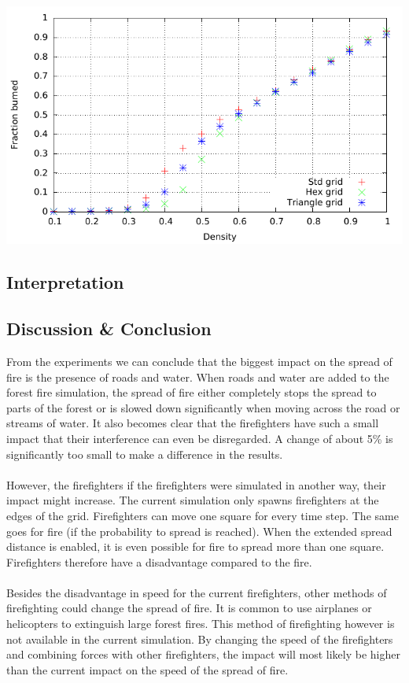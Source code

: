 \documentclass{article}
\newenvironment{Figure}
  {\par\medskip\noindent\minipage{\linewidth}}
  {\endminipage\par\medskip}
\begin{document}
\begin{multicols}{2}
\begin{Figure}
 \centering
 \includegraphics[width=\textwidth]{imgs/plot/ex6/fracburned.pdf}
\label{fig:ex6frac}
\end{Figure}
\subsection*{Interpretation}

\subsection*{Discussion \& Conclusion}
From the experiments we can conclude that the biggest impact on the spread of fire is the presence of roads and water. When roads and water are added to the forest fire simulation, the spread of fire either completely stops the spread to parts of the forest or is slowed down significantly when moving across the road or streams of water. It also becomes clear that the firefighters have such a small impact that their interference can even be disregarded. A change of about 5\% is significantly too small to make a difference in the results.\\\\
However, the firefighters if the firefighters were simulated in another way, their impact might increase. The current simulation only spawns firefighters at the edges of the grid. Firefighters can move one square for every time step. The same goes for fire (if the probability to spread is reached). When the extended spread distance is enabled, it is even possible for fire to spread more than one square. Firefighters therefore have a disadvantage compared to the fire.\\\\ 
Besides the disadvantage in speed for the current firefighters, other methods of firefighting could change the spread of fire. It is common to use airplanes or helicopters to extinguish large forest fires. This method of firefighting however is not available in the current simulation. By changing the speed of the firefighters and combining forces with other firefighters, the impact will most likely be higher than the current impact on the speed of the spread of fire.

\nocite{*}


\end{multicols}
\end{document}

